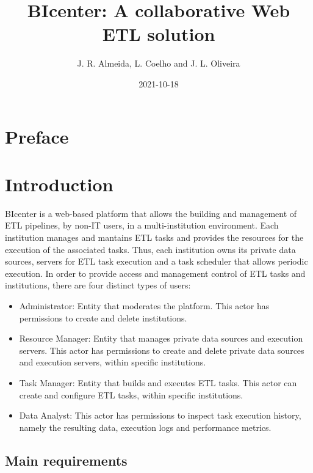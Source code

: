 \documentclass[
  11pt,
]{krantz}
\title{BIcenter: A collaborative Web ETL solution}
\author{J. R. Almeida, L. Coelho and J. L. Oliveira}
\date{2021-10-18}
\providecommand{\tightlist}{%
  \setlength{\itemsep}{0pt}\setlength{\parskip}{0pt}}
\begin{document}
\maketitle

{
\hypersetup{linkcolor=}
\setcounter{tocdepth}{1}
\tableofcontents
}
\listoffigures
\listoftables
\hypertarget{preface}{%
\chapter*{Preface}\label{preface}}


\mainmatter

\hypertarget{introduction}{%
\chapter{Introduction}\label{introduction}}

BIcenter is a web-based platform that allows the building and management of ETL pipelines, by non-IT users, in a multi-institution environment. Each institution manages and mantains ETL tasks and provides the resources for the execution of the associated tasks. Thus, each institution owns its private data sources, servers for ETL task execution and a task scheduler that allows periodic execution. In order to provide access and management control of ETL tasks and institutions, there are four distinct types of users:

\begin{itemize}
\tightlist
\item
  Administrator: Entity that moderates the platform. This actor has permissions to create and delete institutions.
\item
  Resource Manager: Entity that manages private data sources and execution servers. This actor has permissions to create and delete private data sources and execution servers, within specific institutions.
\item
  Task Manager: Entity that builds and executes ETL tasks. This actor can create and configure ETL tasks, within specific institutions.
\item
  Data Analyst: This actor has permissions to inspect task execution history, namely the resulting data, execution logs and performance metrics.
\end{itemize}

\hypertarget{main-requirements}{%
\section{Main requirements}\label{main-requirements}}
\end{document}

